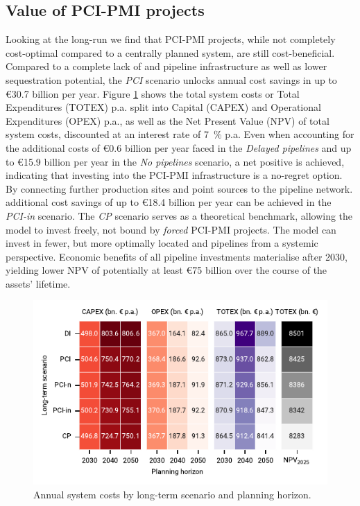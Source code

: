 \documentclass[preprint,12pt,sort&compress]{elsarticle}
\begin{document}
\subsection{Value of PCI-PMI projects}
\label{sec:value_of_pcipmi_projects}
Looking at the long-run we find that PCI-PMI projects, while not completely cost-optimal compared to a centrally planned system, are still cost-beneficial. Compared to a complete lack of  and  pipeline infrastructure as well as lower  sequestration potential, the \textit{PCI} scenario unlocks annual cost savings in up to \euro{30.7} billion per year. Figure \ref{fig:totex_heatmap} shows the total system costs or Total Expenditures (TOTEX) p.a. split into Capital (CAPEX) and Operational Expenditures (OPEX) p.a., as well as the Net Present Value (NPV) of total system costs, discounted at an interest rate of \SI{7}{\percent} p.a.
Even when accounting for the additional costs of \euro{0.6} billion per year faced in the \textit{Delayed pipelines} and up to \euro{15.9} billion per year in the \textit{No pipelines} scenario, a net positive is achieved, indicating that investing into the PCI-PMI infrastructure is a no-regret option. By connecting further  production sites and  point sources to the pipeline network. additional cost savings of up to \euro{18.4} billion per year can be achieved in the \textit{PCI-in} scenario. The \textit{CP} scenario serves as a theoretical benchmark, allowing the model to invest freely, not bound by \textit{forced} PCI-PMI projects. The model can invest in fewer, but more optimally located  and  pipelines from a systemic perspective. Economic benefits of all pipeline investments materialise after 2030, yielding lower NPV of potentially at least \euro{75} billion over the course of the assets' lifetime. 

\begin{figure}[t]
  \centering
  \includegraphics{totex_heatmap.pdf}
  \caption{Annual system costs by long-term scenario and planning horizon.}
  \label{fig:totex_heatmap}
\end{figure}
\end{document}
